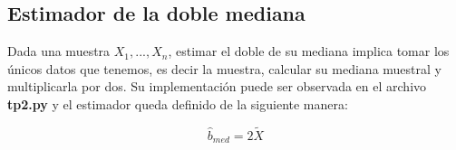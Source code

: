 \subsection{Estimador de la doble mediana}
Dada una muestra $X_{1}, ..., X_{n}$, estimar el doble de su mediana implica tomar los únicos datos que tenemos, es decir la muestra, calcular su mediana muestral y multiplicarla por dos. Su implementación puede ser observada en el archivo \textbf{tp2.py} y el estimador queda definido de la siguiente manera:

$$\hat{b}_{med} = 2 \tilde{X}$$